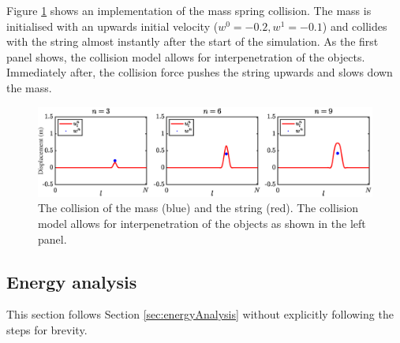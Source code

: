Figure \ref{fig:massStringCollision} shows an implementation of the mass spring collision. The mass is initialised with an upwards initial velocity ($w^0 = -0.2, w^1 = -0.1$) and collides with the string almost instantly after the start of the simulation. As the first panel shows, the collision model allows for interpenetration of the objects. Immediately after, the collision force pushes the string upwards and slows down the mass.

\begin{figure}[h]
    \centering
    \includegraphics[width=\textwidth]{figures/interactions/stringMassCollision.eps}
    \caption{The collision of the mass (blue) and the string (red). The collision model allows for interpenetration of the objects as shown in the left panel. \label{fig:massStringCollision}}
\end{figure}

\subsection{Energy analysis}
This section follows Section \ref{sec:energyAnalysis} without explicitly following the steps for brevity. 

